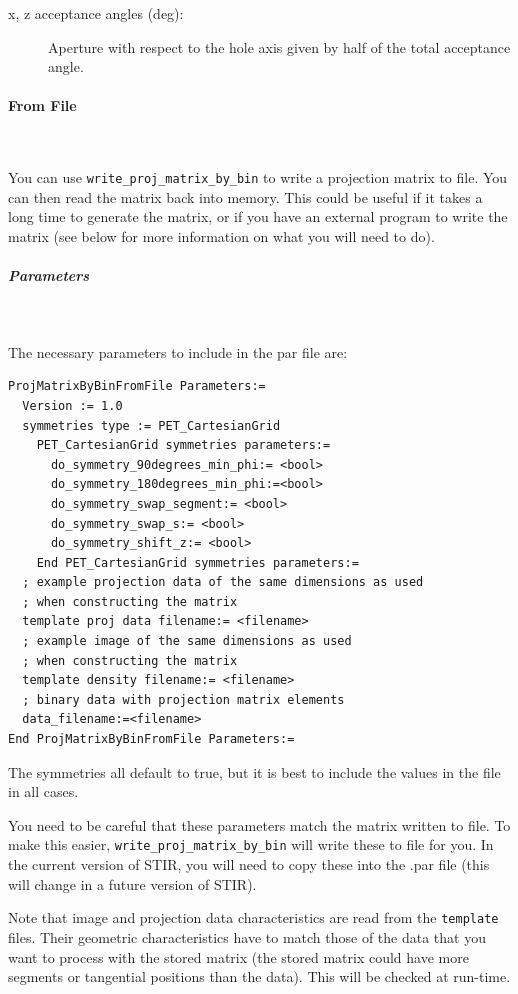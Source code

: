 \documentclass{article}
\newcommand{\subsubsubsection}[1]{\paragraph{#1}\mbox{} \\}
\newcommand{\subsubsubsubsection}[1]{\subparagraph{#1} \mbox{} \\}
\begin{document}
{{{{{{\begin{description}
\begin{description}
\item[x, z acceptance angles (deg):] Aperture with respect to the hole axis given by half of the total acceptance angle.

\end{description}
\end{description}


{ \subsubsubsection{From File} }
\label{sec:projmatrixfromfile}
You can use \texttt{write\_proj\_matrix\_by\_bin} to write a projection matrix to file. You can
then read the matrix back into memory. This
could be useful if it takes a long time to generate the matrix, or if you have an external program
to write the matrix (see below for more information on what you will need to do).


{ \subsubsubsubsection{Parameters}
}
The necessary parameters to include in the par file are:
\begin{verbatim}
ProjMatrixByBinFromFile Parameters:=
  Version := 1.0
  symmetries type := PET_CartesianGrid
    PET_CartesianGrid symmetries parameters:=
      do_symmetry_90degrees_min_phi:= <bool>
      do_symmetry_180degrees_min_phi:=<bool>
      do_symmetry_swap_segment:= <bool>
      do_symmetry_swap_s:= <bool>
      do_symmetry_shift_z:= <bool>
    End PET_CartesianGrid symmetries parameters:=
  ; example projection data of the same dimensions as used 
  ; when constructing the matrix
  template proj data filename:= <filename>
  ; example image of the same dimensions as used 
  ; when constructing the matrix
  template density filename:= <filename>
  ; binary data with projection matrix elements
  data_filename:=<filename> 
End ProjMatrixByBinFromFile Parameters:=
\end{verbatim}
The symmetries all default to true, but it is best to include the values in the file in all cases. 

You need to be careful that these parameters match the matrix written to file. To make this easier,
\texttt{write\_proj\_matrix\_by\_bin} will write these to file for you. In the current version
of STIR, you will need to copy these into the .par file (this will change in a future version of STIR).

Note that image and projection data characteristics are read from the \texttt{template} files. Their geometric
characteristics have to match those of the data that you want to process with the stored matrix
(the stored matrix could have more segments or tangential positions than the data). This will be
checked at run-time.

}}}}}}
\end{document}
